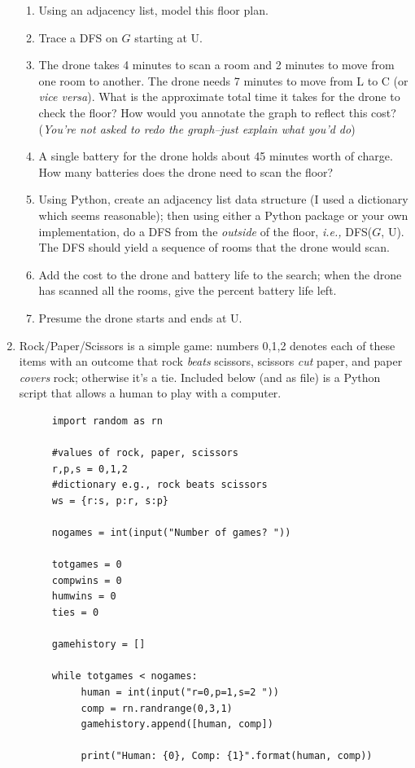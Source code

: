 \documentclass{article}
\begin{document}
\begin{enumerate}
\begin{enumerate}
\item Using an adjacency list, model this floor plan.
\item Trace a DFS on $G$ starting at \textsf{U}.
\item The drone takes 4 minutes to scan a room and 2 minutes to move from one room to another.  The drone needs 7 minutes to move from \textsf{L} to \textsf{C} (or {\it vice versa}).  What is the approximate total time it takes for the drone to check the floor?  How would you annotate the graph to reflect this cost? ({\it You're not asked to redo the graph--just explain what you'd do})
\item A single battery for the drone holds about 45 minutes worth of charge.  How many batteries does the drone need to scan the floor?
\item Using Python, create an adjacency list data structure (I used a dictionary which seems reasonable); then using either a Python package or your own implementation, do a DFS from the {\it outside} of the floor, {\it i.e.,} DFS($G$, \textsf{U}).  The DFS should yield a sequence of rooms that the drone would scan.
\item Add the cost to the drone and battery life to the search; when the drone has scanned all the rooms, give the percent battery life left. 
\item  Presume the drone starts and ends at \textsf{U}.
\end{enumerate}
\item Rock/Paper/Scissors is a simple game: numbers 0,1,2 denotes each of these items with an outcome that rock {\it beats} scissors, scissors {\it cut} paper, and paper {\it covers} rock; otherwise it's a tie.  Included below (and as file) is a Python script that allows a human to play with a computer. 
\begin{figure}[h]
{\small
\begin{verbatim}
import random as rn

#values of rock, paper, scissors
r,p,s = 0,1,2
#dictionary e.g., rock beats scissors
ws = {r:s, p:r, s:p}

nogames = int(input("Number of games? "))

totgames = 0
compwins = 0
humwins = 0
ties = 0

gamehistory = []

while totgames < nogames:
     human = int(input("r=0,p=1,s=2 "))
     comp = rn.randrange(0,3,1)
     gamehistory.append([human, comp])

     print("Human: {0}, Comp: {1}".format(human, comp))


\end{verbatim}}
\end{figure}
\end{enumerate}
\end{document}

